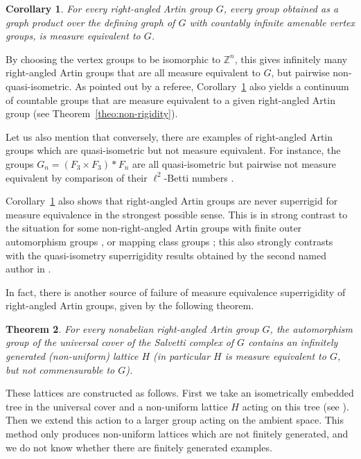 \documentclass[JEP,XML,SOM,Unicode,NoFloatCountersInSection,published]{cedram}
\theoremstyle{plain}
\newtheorem{theointro}{Theorem}
\newtheorem{corintro}[theointro]{Corollary}
\theoremstyle{definition}
\begin{document}
\begin{corintro}\label{corintro:graph-products}
For every right-angled Artin group $G$, every group obtained as a graph product over the defining graph of $G$ with countably infinite amenable vertex groups, is measure equivalent to $G$.
\end{corintro}

By choosing the vertex groups to be isomorphic to $\mathbb{Z}^n$, this gives infinitely many right-angled Artin groups that are all measure equivalent to $G$, but pairwise non-quasi-isometric. As pointed out by a referee, Corollary~\ref{corintro:graph-products} also yields a continuum of countable groups that are measure equivalent to a given right-angled Artin group (see Theorem~\ref{theo:non-rigidity}).

Let us also mention that conversely, there are examples of right-angled Artin groups which are quasi-isometric but not measure equivalent. For instance, the groups $G_n=(F_3\times F_3)\ast F_n$ are all quasi-isometric \cite[Th.\,1.5]{Why} but pairwise not measure equivalent by comparison of their $\ell^2$-Betti numbers \cite[Cor.\,0.3]{Gab-betti}.

Corollary~\ref{corintro:graph-products} also shows that right-angled Artin groups are never superrigid for measure equivalence in the strongest possible sense. This is in strong contrast to the situation for some non-right-angled Artin groups with finite outer automorphism groups \cite{HH}, or mapping class groups \cite{Kid}; this also strongly contrasts with the quasi-isometry superrigidity results obtained by the second named author in \cite{Hua2}.

In fact, there is another source of failure of measure equivalence superrigidity of right-angled Artin groups, given by the following theorem.

\begin{theointro}\label{theointro-non-superrigid}
For every nonabelian right-angled Artin group $G$, the automorphism group of the universal cover of the Salvetti complex of $G$ contains an infinitely generated (non-uniform) lattice $H$ (in particular $H$ is measure equivalent to $G$, but not commensurable to $G$).
\end{theointro}

These lattices are constructed as follows. First we take an isometrically embedded tree in the universal cover and a non-uniform lattice $H$ acting on this tree (see \eg \cite{bass2001tree}). Then we extend this action to a larger group acting on the ambient space. This method only produces non-uniform lattices which are not finitely generated, and we do not know whether there are finitely generated examples.
\end{document}
